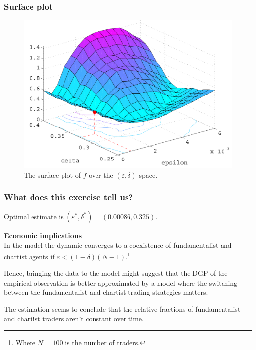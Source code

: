 \documentclass[10pt]{beamer}
\begin{document}
\begin{frame}[c]\frametitle{Surface plot}
	\begin{figure} \centering
		\includegraphics[scale=.25]{figures/gilli_2001_surface.png}
		\caption{The \citet{gilli2001estimation} surface plot of $f$ over the $(\varepsilon, \delta)$ space.}
	\end{figure}
\end{frame}


\begin{frame}[c]\frametitle{What does this exercise tell us?}
    Optimal estimate is $(\varepsilon^{*}, \delta^{*}) = (0.00086,0.325)$. \bigskip

    \alert{\textbf{Economic implications}}
    \\ In the \citet{kirman1991epidemics} model the dynamic converges to a coexistence of fundamentalist and chartist agents if $\varepsilon < (1-\delta)(N-1)$.\footnote{Where $N=100$ is the number of traders.} \bigskip

    Hence, bringing the data to the model might suggest that the DGP of the empirical observation is better approximated by a model where the switching between the fundamentalist and chartist trading strategies matters. \bigskip

    The estimation seems to conclude that the relative fractions of fundamentalist and chartist traders aren't constant over time.
\end{frame}
\end{document}
